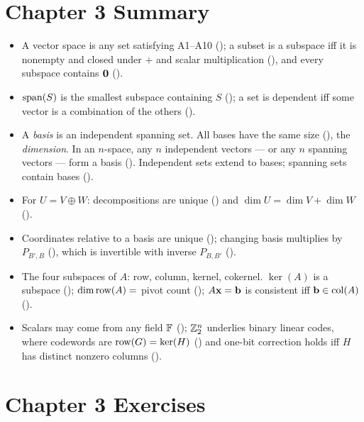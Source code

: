 \section*{Chapter 3 Summary}
\begin{itemize}[leftmargin=1.4em,itemsep=2pt]
\item A vector space is any set satisfying A1--A10 (); a subset is a subspace iff it is nonempty and closed under $+$ and scalar multiplication (), and every subspace contains $\mathbf{0}$ ().
\item $\operatorname{span}(S)$ is the smallest subspace containing $S$ (); a set is dependent iff some vector is a combination of the others ().
\item A \emph{basis} is an independent spanning set. All bases have the same size (), the \emph{dimension}. In an $n$-space, any $n$ independent vectors --- or any $n$ spanning vectors --- form a basis (). Independent sets extend to bases; spanning sets contain bases ().
\item For $U=V\oplus W$: decompositions are unique () and $\dim U=\dim V+\dim W$ ().
\item Coordinates relative to a basis are unique (); changing basis multiplies by $P_{B',B}$ (), which is invertible with inverse $P_{B,B'}$ ().
\item The four subspaces of $A$: row, column, kernel, cokernel. $\ker(A)$ is a subspace (); $\operatorname{dim}\operatorname{row}(A)=$ pivot count (); $A\mathbf{x}=\mathbf{b}$ is consistent iff $\mathbf{b}\in\operatorname{col}(A)$ ().
\item Scalars may come from any field $\mathbb{F}$ (); $\mathbb{Z}_2^n$ underlies binary linear codes, where codewords are $\operatorname{row}(G)=\ker(H)$ () and one-bit correction holds iff $H$ has distinct nonzero columns ().
\end{itemize}

\section*{Chapter 3 Exercises}

